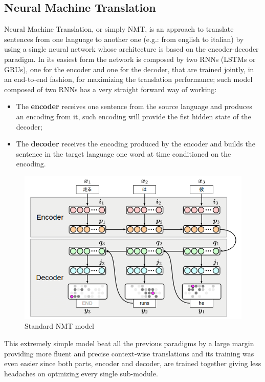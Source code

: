 \subsection{Neural Machine Translation}\label{subsec:NMT}
Neural Machine Translation, or simply NMT, is an approach to translate sentences from one language to another one (e.g.: from english to italian) by using a single neural network whose architecture is based on the encoder-decoder paradigm.
In its easiest form the network is composed by two RNNs (LSTMs or GRUs), one for the encoder and one for the decoder, that are trained jointly, in an end-to-end fashion, for maximizing the translation performance; such model composed of two RNNs has a very straight forward way of working:
\begin{itemize}
    \item The \textbf{encoder} receives one sentence from the source language and produces an encoding from it, such encoding will provide the fist hidden state of the decoder;
    \item The \textbf{decoder} receives the encoding produced by the encoder and builds the sentence in the target language one word at time conditioned on the encoding.
\end{itemize}
\begin{figure}[H]%
    \centering
    \includegraphics[width=0.65\linewidth]{images/seq2seq.png}
    \caption{Standard NMT model}
    \label{fig:NMT_model}
\end{figure}
This extremely simple model beat all the previous paradigms by a large margin providing more fluent and precise context-wise translations and its training was even easier since both parts, encoder and decoder, are trained together giving less headaches on optmizing every single sub-module.
